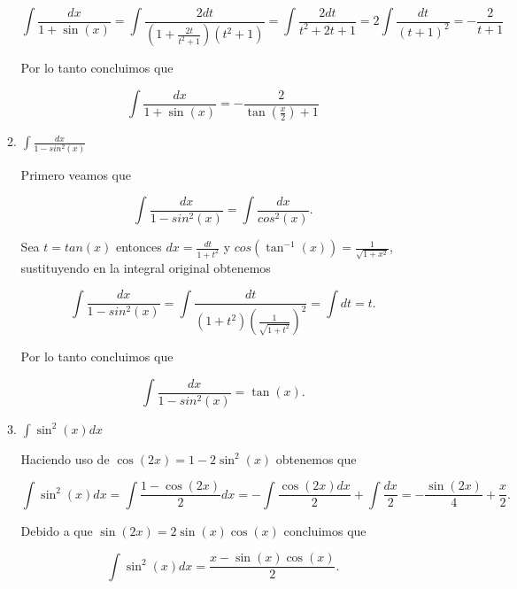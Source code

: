 \documentclass[letterpaper]{article}
\theoremstyle{definition}
\theoremstyle{lemathm}
\theoremstyle{lemademthm}
\begin{document}
\begin{enumerate}
\begin{enumerate}
			\[\int \frac{dx}{1+\sin(x)} = \int \frac{2dt}{\left(1 + \frac{2t}{t^2+1}\right)(t^2 + 1)} = \int \frac{2dt}{t^2 + 2t + 1} = 2\int \frac{dt}{(t+1)^2} = -\frac{2}{t+1}\]

			Por lo tanto concluimos que

			\[\int \frac{dx}{1+\sin(x)} = -\frac{2}{\tan\left(\frac{x}{2}\right)+1}\]
			
            \item $\int \frac{dx}{1-sin^2(x)}$
			
			Primero veamos que

			\[\int \frac{dx}{1-sin^2(x)} = \int \frac{dx}{cos^2(x)}.\]

			Sea $t = tan(x)$ entonces $dx = \frac{dt}{1+t^2}$ y $cos(\tan^{-1}(x)) = \frac{1}{\sqrt{1+x^2}}$, sustituyendo en la integral original obtenemos

			\[\int \frac{dx}{1-sin^2(x)} = \int \frac{dt}{(1+t^2)\left(\frac{1}{\sqrt{1+t^2}}\right)^2} = \int dt = t.\]

			Por lo tanto concluimos que

			\[\int \frac{dx}{1-sin^2(x)} = \tan(x).\]
			
            \item $\int \sin^2(x)dx$
		
			Haciendo uso de $\cos(2x) = 1 - 2\sin^2(x)$ obtenemos que

			\[\int \sin^2(x)dx = \int \frac{1-\cos(2x)}{2}dx = - \int \frac{\cos(2x)dx}{2} + \int \frac{dx}{2} = - \frac{\sin(2x)}{4} + \frac{x}{2}.\]

			Debido a que $\sin(2x) = 2\sin(x)\cos(x)$ concluimos que

			\[\int \sin^2(x)dx = \frac{x - \sin(x)\cos(x)}{2}.\]

        \end{enumerate}

    \end{enumerate}
\end{document}
